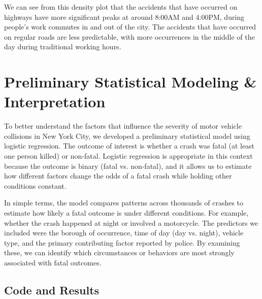 \documentclass[10pt]{article}\usepackage[]{graphicx}\usepackage[]{xcolor}
\begin{document}
We can see from this density plot that the accidents that have occurred on highways have more significant peaks at around 8:00AM and 4:00PM, during people’s work commutes in and out of the city. The accidents that have occurred on regular roads are less predictable, with more occurrences in the middle of the day during traditional working hours.


\section{Preliminary Statistical Modeling \& Interpretation}

To better understand the factors that influence the severity of motor vehicle collisions in New York City, we developed a preliminary statistical model using logistic regression. The outcome of interest is whether a crash was fatal (at least one person killed) or non-fatal. Logistic regression is appropriate in this context because the outcome is binary (fatal vs. non-fatal), and it allows us to estimate how different factors change the odds of a fatal crash while holding other conditions constant.

In simple terms, the model compares patterns across thousands of crashes to estimate how likely a fatal outcome is under different conditions. For example, whether the crash happened at night or involved a motorcycle. The predictors we included were the borough of occurrence, time of day (day vs. night), vehicle type, and the primary contributing factor reported by police. By examining these, we can identify which circumstances or behaviors are most strongly associated with fatal outcomes.

\subsection{Code and Results}
\end{document}
